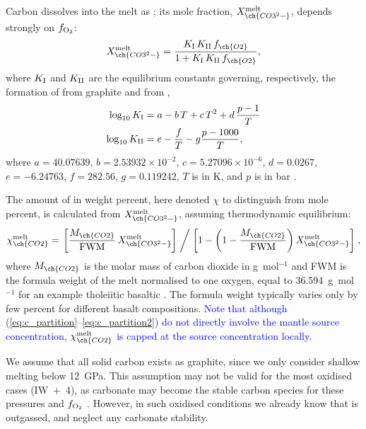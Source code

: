 \documentclass[3p,authoryear]{elsarticle}
\newcommand{\editthree}[2]{\textcolor{blue}{\sout{#1}#2}}
\begin{document}
Carbon dissolves into the melt as ; its mole fraction, $X_{\ch{CO3^2-}}^{\rm melt}$, depends strongly on $f_{\rm O_2}$:
\begin{equation}\label{eq:c_partition}
    X_{\ch{CO3^2-}}^{\rm melt} = \frac{K_{\rm I} \, K_{\rm II} \, f_{\ch{O2}}}{1+K_{\rm I} \, K_{\rm II} \, f_{\ch{O2}}},
\end{equation}
where $K_{\rm I}$ and $K_{\rm II}$ are the equilibrium constants governing, respectively, the formation of  from graphite and  from ,
\begin{align}
    \log_{10} K_{\rm I} &= a - b \, T + c \, T^2 + d \, \frac{p-1}{T}\\ 
    \log_{10} K_{\rm II} &= e - \frac{f}{T} - g \frac{p-1000}{T},
\end{align}
where $a = 40.07639$, $b = 2.53932\times 10^{-2}$, $c = 5.27096\times 10^{-6}$, $d=0.0267$, $e = -6.24763$, $f=282.56$, $g=0.119242$, $T$ is in K, and $p$ is in bar \citep{Holloway1992, Grott2011, Hirschmann2008}. 

The amount of  in weight percent, here denoted $\chi$ to distinguish from mole percent, is calculated from $X_{\ch{CO3^2-}}^{\rm melt}$, assuming thermodynamic equilibrium:
\begin{equation}\label{eq:c_partition2}
    \chi_{\ch{CO2}}^{\rm melt} = \left. \left[\frac{M_{\ch{CO2}}}{\rm FWM} \, X_{\ch{CO3^2-}}^{\rm melt} \right] \; \middle/ \; \left[ 1 - \left(1-\frac{M_{\ch{CO2}}}{\rm FWM} \right) X_{\ch{CO3^2-}}^{\rm melt}\right] \right. ,
\end{equation}
where $M_{\ch{CO2}}$ is the molar mass of carbon dioxide in g~mol$^{-1}$ and FWM is the formula weight of the melt normalised to one oxygen, equal to 36.594~g~mol$^{-1}$ for an example tholeiitic basaltic \citep{Holloway1992, Grott2011}. The formula weight typically varies only by few percent for different basalt compositions. \editthree{}{Note that although (\ref{eq:c_partition}--\ref{eq:c_partition2}) do not directly involve the mantle source concentration, $\chi_{\ch{CO2}}^{\rm melt}$ is capped at the source concentration locally.}

We assume that all solid carbon exists as graphite, since we only consider shallow melting below 12~GPa. This assumption may not be valid for the most oxidised cases (IW~+~4), as carbonate may become the stable carbon species for these pressures and $f_{\rm O_2}$ \citep{Stagno2019}. However, in such oxidised conditions we already know that  is outgassed, and neglect any carbonate stability.
\end{document}
